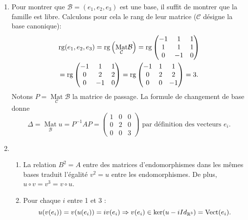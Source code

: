 \begin{enumerate}
\item Pour montrer que $\mathcal{B}=(e_1,e_2,e_3)$ est une base, il suffit de montrer que la famille est libre. Calculons pour cela le rang de leur matrice ($\mathcal C$ désigne la base canonique):
\begin{multline*}
 \operatorname{rg} (e_1,e_2,e_3) = \operatorname{rg} \left( \underset{\mathcal{C}}{\mathop{\mathrm{Mat}}}\mathcal{B} \right) 
 = \operatorname{rg} \begin{pmatrix}
-1 & 1 & 1 \\
1 & 1 & 1 \\
0 & -1 & 0
        \end{pmatrix} \\
 =  \operatorname{rg} \begin{pmatrix}
-1 & 1 & 1 \\
0 & 2 & 2 \\
0 & -1 & 0
        \end{pmatrix}
 =  \operatorname{rg} \begin{pmatrix}
-1 & 1 & 1 \\
0 & 2 & 2 \\
0 & 0 & -1
        \end{pmatrix} = 3.
\end{multline*}
Notons $P=\underset{\mathcal{C}}{\mathop{\mathrm{Mat}}}\mathcal{B}$ la matrice de passage. La formule de changement de base donne
\[
\Delta = \underset{\mathcal{B}}{\mathop{\mathrm{Mat}}}u=P^{-1}A P
 = \begin{pmatrix}
1 & 0 & 0 \\ 
0 & 2 & 0 \\ 
0 & 0 & 3
\end{pmatrix} 
\text{ par définition des vecteurs $e_i$.}
\]

\item 
\begin{enumerate}
   \item La relation $B^2=A$ entre des matrices d'endomorphismes dans les mêmes bases traduit l'égalité $v^2=u$ entre les endomorphismes. De plus, $u\circ v= v^3 = v \circ u$.

   \item Pour chaque $i$ entre 1 et 3 :
\[
u(v(e_i))=v(u(e_i))=iv(e_i)
 \Rightarrow v(e_i)\in \ker(u-iId_{\mathbb{R}^3})=\operatorname{Vect} (e_i).
\]


\end{enumerate}
\end{enumerate}

